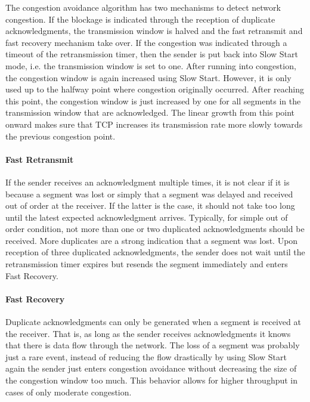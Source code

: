 The congestion avoidance algorithm has two mechanisms to detect network congestion. If the blockage is indicated through the reception of duplicate acknowledgments, the transmission window is halved and the fast retransmit and fast recovery mechanism take over. If the congestion was indicated through a timeout of the retransmission timer, then the sender is put back into Slow Start mode, i.e. the transmission window is set to one. After running into congestion, the congestion window is again increased using Slow Start. However, it is only used up to the halfway point where congestion originally occurred. After reaching this point, the congestion window is just increased by one for all segments in the transmission window that are acknowledged. The linear growth from this point onward makes sure that TCP increases its transmission rate more slowly towards the previous congestion point.  

\paragraph{Fast Retransmit}

If the sender receives an acknowledgment multiple times, it is not clear if it is because a segment was lost or simply that a segment was delayed and received out of order at the receiver. If the latter is the case, it should not take too long until the latest expected acknowledgment arrives. Typically, for simple out of order condition, not more than one or two duplicated acknowledgments should be received. More duplicates are a strong indication that a segment was lost. Upon reception of three duplicated acknowledgments, the sender does not wait until the retransmission timer expires but resends the segment immediately and enters Fast Recovery.

\paragraph{Fast Recovery}

Duplicate acknowledgments can only be generated when a segment is received at the receiver. That is, as long as the sender receives acknowledgments it knows that there is data flow through the network. The loss of a segment was probably just a rare event, instead of reducing the flow drastically by using Slow Start again the sender just enters congestion avoidance without decreasing the size of the congestion window too much. This behavior allows for higher throughput in cases of only moderate congestion.

